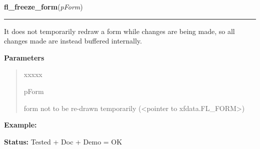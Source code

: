     \label{xformslib:library:fl_freeze_form}

    \vspace{0.5ex}

\hspace{.8\funcindent}\begin{boxedminipage}{\funcwidth}

    \raggedright \textbf{fl\_freeze\_form}(\textit{pForm})

    \vspace{-1.5ex}

    \rule{\textwidth}{0.5\fboxrule}
\setlength{\parskip}{2ex}
    It does not temporarily redraw a form while changes are being made, so 
    all changes made are instead buffered internally.

\setlength{\parskip}{1ex}
      \textbf{Parameters}
      \vspace{-1ex}

      \begin{quote}
        \begin{Ventry}{xxxxx}

          \item[pForm]

          form not to be re-drawn temporarily ({\textless}pointer to 
          xfdata.FL\_FORM{\textgreater})

        \end{Ventry}

      \end{quote}

\textbf{Example:} 

\textbf{Status:} Tested + Doc + Demo = OK



    \end{boxedminipage}

    \label{xformslib:library:fl_set_focus_object}

    \vspace{0.5ex}

